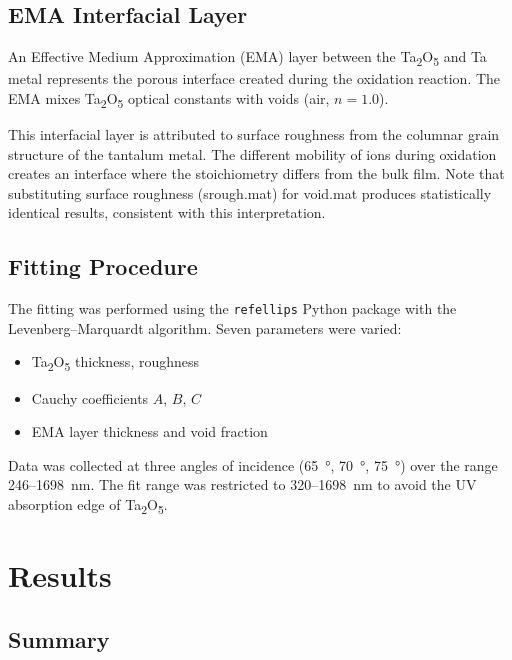 \documentclass[11pt]{article}
\begin{document}
\subsection{EMA Interfacial Layer}

An Effective Medium Approximation (EMA) layer between the Ta\textsubscript{2}O\textsubscript{5}
and Ta metal represents the porous interface created during the oxidation reaction. The EMA
mixes Ta\textsubscript{2}O\textsubscript{5} optical constants with voids (air, $n = 1.0$).

This interfacial layer is attributed to surface roughness from the columnar grain structure
of the tantalum metal. The different mobility of ions during oxidation creates an interface
where the stoichiometry differs from the bulk film. Note that substituting surface roughness
(srough.mat) for void.mat produces statistically identical results, consistent with this
interpretation.

\subsection{Fitting Procedure}

The fitting was performed using the \texttt{refellips} Python package with the
Levenberg--Marquardt algorithm. Seven parameters were varied:
\begin{itemize}
\item Ta\textsubscript{2}O\textsubscript{5} thickness, roughness
\item Cauchy coefficients $A$, $B$, $C$
\item EMA layer thickness and void fraction
\end{itemize}

Data was collected at three angles of incidence (\SI{65}{\degree}, \SI{70}{\degree},
\SI{75}{\degree}) over the range \SI{246}{}--\SI{1698}{nm}. The fit range was restricted
to \SI{320}{}--\SI{1698}{nm} to avoid the UV absorption edge of Ta\textsubscript{2}O\textsubscript{5}.

\section{Results}

\subsection{Summary}
\end{document}
